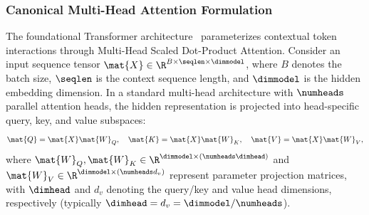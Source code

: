 \subsubsection{Canonical Multi-Head Attention Formulation}
The foundational Transformer architecture~\cite{vaswani2017attention} parameterizes contextual token interactions through Multi-Head Scaled Dot-Product Attention. Consider an input sequence tensor $\mat{X} \in \R^{B \times \seqlen \times \dimmodel}$, where $B$ denotes the batch size, $\seqlen$ is the context sequence length, and $\dimmodel$ is the hidden embedding dimension. In a standard multi-head architecture with $\numheads$ parallel attention heads, the hidden representation is projected into head-specific query, key, and value subspaces:
\begin{equation}
\mat{Q} = \mat{X} \mat{W}_Q, \quad \mat{K} = \mat{X} \mat{W}_K, \quad \mat{V} = \mat{X} \mat{W}_V,
\label{eq:qkv_projections}
\end{equation}
where $\mat{W}_Q, \mat{W}_K \in \R^{\dimmodel \times (\numheads \dimhead)}$ and $\mat{W}_V \in \R^{\dimmodel \times (\numheads d_v)}$ represent parameter projection matrices, with $\dimhead$ and $d_v$ denoting the query/key and value head dimensions, respectively (typically $\dimhead = d_v = \dimmodel / \numheads$).

